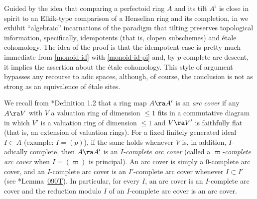 


















 \label{sec:tilting-cohomology}


Guided by the idea that comparing a perfectoid ring $A$ and its tilt $A^\flat$ is close in spirit to an Elkik-type comparison of a Henselian ring and its completion, in  we exhibit ``algebraic'' incarnations of the paradigm that tilting preserves topological information, specifically, idempotents (that is, clopen subschemes) and \'etale cohomology. The idea of the proof is that the  idempotent case is pretty much immediate from \eqref{monoid-id} with \eqref{monoid-id-pi} and, by $p$-complete arc descent, it implies the assertion about the \'{e}tale cohomology. This style of argument bypasses any recourse to adic spaces, although, of course, the conclusion is not as strong as an equivalence of \'{e}tale sites.


 \label{pp:arc-topology}\label{eg:fflat-is-arc}
We recall from \cite{BM20}*{Definition 1.2} that a ring map $A \ra A'$ is an \emph{arc cover} if any $A \ra V$ with $V$ a valuation ring of dimension $\le 1$ fits in a commutative diagram
\be\label{test-diagram}\ba
{}
\ea\ee
in which $V'$ is a valuation ring of dimension $\le 1$ and $V \ra V'$ is faithfully flat (that is, an extension of valuation rings). For a fixed finitely generated ideal $I \subset A$ (example: $I = (p)$), if the same holds whenever $V$ is, in addition, $I$-adically complete, %
then $A \ra A'$ is an \emph{$I$-complete arc cover} (called a \emph{$\varpi$-complete arc cover} when $I = (\varpi)$ is principal). %
An arc cover is simply a $0$-complete arc cover, and %
an $I$-complete arc cover is an $I'$-complete arc cover whenever $I \subset I'$ (see \cite{SP}*{Lemma~\href{https://stacks.math.columbia.edu/tag/090T}{090T}}). In particular, for every $I$, an arc cover is an $I$-complete arc cover and the reduction modulo $I$ of an $I$-complete arc cover is an %
arc cover. %

